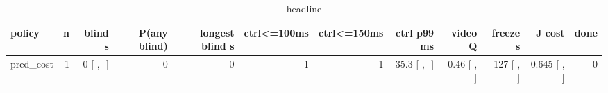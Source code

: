 \begin{table}[t]\centering\small
\begin{tabular}{lrrrrrrrrrrr}\toprule
policy & n & blind s & P(any blind) & longest blind s & ctrl<=100ms & ctrl<=150ms & ctrl p99 ms & video Q & freeze s & J cost & done \\\midrule
pred\_cost & 1 & 0 [-, -] & 0 & 0 & 1 & 1 & 35.3 [-, -] & 0.46 [-, -] & 127 [-, -] & 0.645 [-, -] & 0 \\
\bottomrule\end{tabular}\caption{headline}\end{table}

